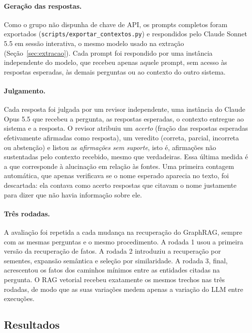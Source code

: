 \paragraph{Geração das respostas.} Como o grupo não dispunha de chave de API, os prompts completos foram exportados (\texttt{scripts/exportar\_contextos.py}) e respondidos pelo Claude Sonnet 5.5 em sessão interativa, o mesmo modelo usado na extração (Seção~\ref{sec:extracao}). Cada prompt foi respondido por uma instância independente do modelo, que recebeu apenas aquele prompt, sem acesso às respostas esperadas, às demais perguntas ou ao contexto do outro sistema.

\paragraph{Julgamento.} Cada resposta foi julgada por um revisor independente, uma instância do Claude Opus 5.5 que recebeu a pergunta, as respostas esperadas, o contexto entregue ao sistema e a resposta. O revisor atribuiu um \emph{acerto} (fração das respostas esperadas efetivamente afirmadas como resposta), um veredito (correta, parcial, incorreta ou abstenção) e listou as \emph{afirmações sem suporte}, isto é, afirmações não sustentadas pelo contexto recebido, mesmo que verdadeiras. Essa última medida é a que corresponde à alucinação em relação às fontes. Uma primeira contagem automática, que apenas verificava se o nome esperado aparecia no texto, foi descartada: ela contava como acerto respostas que citavam o nome justamente para dizer que não havia informação sobre ele.

\paragraph{Três rodadas.} A avaliação foi repetida a cada mudança na recuperação do GraphRAG, sempre com as mesmas perguntas e o mesmo procedimento. A rodada 1 usou a primeira versão da recuperação de fatos. A rodada 2 introduziu a recuperação por sementes, expansão semântica e seleção por similaridade. A rodada 3, final, acrescentou os fatos dos caminhos mínimos entre as entidades citadas na pergunta. O RAG vetorial recebeu exatamente os mesmos trechos nas três rodadas, de modo que as suas variações medem apenas a variação do LLM entre execuções.

\subsection{Resultados}


